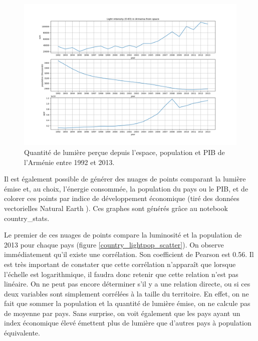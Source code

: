 \documentclass[a4paper, 11pt]{report}
\begin{document}
\begin{figure}
	\centering
	\includegraphics[width=1.0\textwidth]{img/sum_Armenia.png}
	\caption{Quantité de lumière perçue depuis l'espace, population et PIB de l'Arménie entre 1992 et 2013.}
	\label{sum_Armenia}
\end{figure}

Il est également possible de générer des nuages de points comparant la lumière émise et, au choix, l'énergie consommée, la population du pays ou le PIB, et de colorer ces points par indice de développement économique (tiré des données vectorielles Natural Earth \cite{naturalearthdata}). Ces graphes sont générés grâce au notebook country\_stats.

Le premier de ces nuages de points compare la luminosité et la population de 2013 pour chaque pays (figure \ref{country_lightpop_scatter}). On observe immédiatement qu'il existe une corrélation. Son coefficient de Pearson est 0.56. Il est très important de constater que cette corrélation n'apparaît que lorsque l'échelle est logarithmique, il faudra donc retenir que cette relation n'est pas linéaire. On ne peut pas encore déterminer s'il y a une relation directe, ou si ces deux variables sont simplement corrélées à la taille du territoire. En effet, on ne fait que sommer la population et la quantité de lumière émise, on ne calcule pas de moyenne par pays.
Sans surprise, on voit également que les pays ayant un index économique élevé émettent plus de lumière que d'autres pays à population équivalente.
\end{document}
